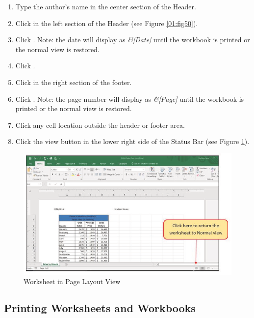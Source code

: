\begin{enumerate}[resume]
	\item Type the author's name in the center section of the Header.
	\item Click in the left section of the Header (see Figure \ref{01:fig50}).
	\item Click . Note: the date will display as \textit{\&[Date]} until the workbook is printed or the normal view is restored.
	\item Click .
	\item Click in the right section of the footer.
	\item Click . Note: the page number will display as \textit{\&[Page]} until the workbook is printed or the normal view is restored.
	\item Click any cell location outside the header or footer area.
	\item Click the  view button in the lower right side of the Status Bar (see Figure \ref{01:fig51}).

\end{enumerate}

\begin{figure}[H]
	\centering
	\includegraphics[width=\maxwidth{.95\linewidth}]{gfx/ch01_fig51}
	\caption{Worksheet in Page Layout View}
	\label{01:fig51}
\end{figure}

\subsection{Printing Worksheets and Workbooks}

